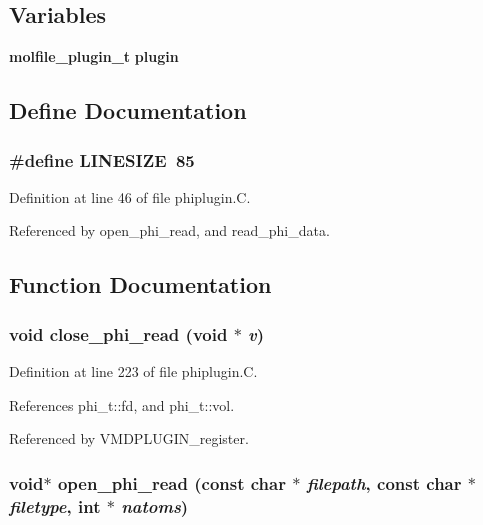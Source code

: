 \subsection*{Variables}
\begin{CompactItemize}
\item 
{\bf molfile\_\-plugin\_\-t} {\bf plugin}
\end{CompactItemize}


\subsection{Define Documentation}
\subsubsection{\setlength{\rightskip}{0pt plus 5cm}\#define LINESIZE\ 85}\label{phiplugin_8C_a0}




Definition at line 46 of file phiplugin.C.

Referenced by open\_\-phi\_\-read, and read\_\-phi\_\-data.

\subsection{Function Documentation}
\subsubsection{\setlength{\rightskip}{0pt plus 5cm}void close\_\-phi\_\-read (void $\ast$ {\em v})\hspace{0.3cm}{\tt  [static]}}\label{phiplugin_8C_a6}




Definition at line 223 of file phiplugin.C.

References phi\_\-t::fd, and phi\_\-t::vol.

Referenced by VMDPLUGIN\_\-register.
\subsubsection{\setlength{\rightskip}{0pt plus 5cm}void$\ast$ open\_\-phi\_\-read (const char $\ast$ {\em filepath}, const char $\ast$ {\em filetype}, int $\ast$ {\em natoms})\hspace{0.3cm}{\tt  [static]}}\label{phiplugin_8C_a3}




